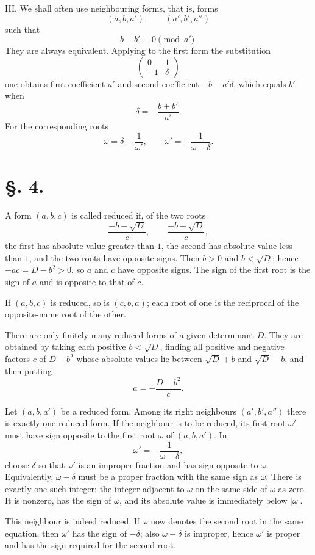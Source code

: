 \documentclass[11pt]{article}
\begin{document}
III. We shall often use neighbouring forms, that is, forms
\[
 (a,b,a'),
 \qquad
 (a',b',a'')
\]
such that
\[
 b+b'\equiv0\pmod {a'}.
\]
They are always equivalent. Applying to the first form the substitution
\[
 \begin{pmatrix}0&1\\-1&\delta\end{pmatrix}
\]
one obtains first coefficient $a'$ and second coefficient $-b-a'\delta$, which equals $b'$ when
\[
 \delta=-\frac{b+b'}{a'}.
\]
For the corresponding roots
\[
 \omega=\delta-
\frac1{\omega'},
 \qquad
 \omega'=-\frac1{\omega-
\delta}.
\]

\section*{\S. 4.}

A form $(a,b,c)$ is called reduced if, of the two roots
\[
 \frac{-b-
\sqrt D}{c},
 \qquad
 \frac{-b+
\sqrt D}{c},
\]
the first has absolute value greater than $1$, the second has absolute value less than $1$, and the two roots have opposite signs. Then $b>0$ and $b<\sqrt D$; hence $-ac=D-b^2>0$, so $a$ and $c$ have opposite signs. The sign of the first root is the sign of $a$ and is opposite to that of $c$.

If $(a,b,c)$ is reduced, so is $(c,b,a)$; each root of one is the reciprocal of the opposite-name root of the other.

There are only finitely many reduced forms of a given determinant $D$. They are obtained by taking each positive $b<\sqrt D$, finding all positive and negative factors $c$ of $D-b^2$ whose absolute values lie between $\sqrt D+b$ and $\sqrt D-b$, and then putting
\[
 a=-\frac{D-b^2}{c}.
\]

Let $(a,b,a')$ be a reduced form. Among its right neighbours $(a',b',a'')$ there is exactly one reduced form. If the neighbour is to be reduced, its first root $\omega'$ must have sign opposite to the first root $\omega$ of $(a,b,a')$. In
\[
 \omega'=-\frac1{\omega-
\delta},
\]
choose $\delta$ so that $\omega'$ is an improper fraction and has sign opposite to $\omega$. Equivalently, $\omega-
\delta$ must be a proper fraction with the same sign as $\omega$. There is exactly one such integer: the integer adjacent to $\omega$ on the same side of $\omega$ as zero. It is nonzero, has the sign of $\omega$, and its absolute value is immediately below $|\omega|$.

This neighbour is indeed reduced. If $\omega$ now denotes the second root in the same equation, then $\omega'$ has the sign of $-\delta$; also $\omega-
\delta$ is improper, hence $\omega'$ is proper and has the sign required for the second root.
\end{document}
